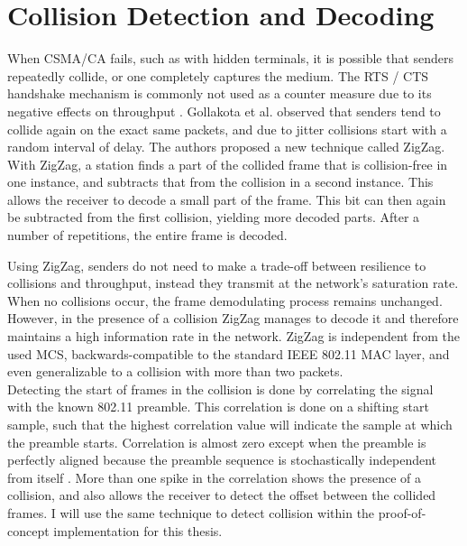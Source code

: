 
\section{Collision Detection and Decoding}

When \gls{CSMA/CA} fails, such as with hidden terminals, it is possible that senders repeatedly collide, or one completely captures the medium. The \gls{RTS} / \gls{CTS} handshake mechanism is commonly not used as a counter measure due to its negative effects on throughput \cite{bianchi2000, gollakota2008, choi2013}. Gollakota et al. observed that senders tend to collide again on the exact same packets, and due to jitter collisions start with a random interval of delay. The authors proposed a new technique called ZigZag. With ZigZag, a station finds a part of the collided frame that is collision-free in one instance, and subtracts that from the collision in a second instance. This allows the receiver to decode a small part of the frame. This bit can then again be subtracted from the first collision, yielding more decoded parts. After a number of repetitions, the entire frame is decoded.

Using ZigZag, senders do not need to make a trade-off between resilience to collisions and throughput, instead they transmit at the network's saturation rate. When no collisions occur, the frame demodulating process remains unchanged. However, in the presence of a collision ZigZag manages to decode it and therefore maintains a high information rate in the network. ZigZag is independent from the used \gls{MCS}, backwards-compatible to the standard IEEE 802.11 \gls{MAC} layer, and even generalizable to a collision with more than two packets.\\

Detecting the start of frames in the collision is done by correlating the signal with the known 802.11 preamble. This correlation is done on a shifting start sample, such that the highest correlation value will indicate the sample at which the preamble starts. Correlation is almost zero except when the preamble is perfectly aligned because the preamble sequence is stochastically independent from itself \cite{ieee2012}. More than one spike in the correlation shows the presence of a collision, and also allows the receiver to detect the offset between the collided frames. I will use the same technique to detect collision within the proof-of-concept implementation for this thesis.\\

